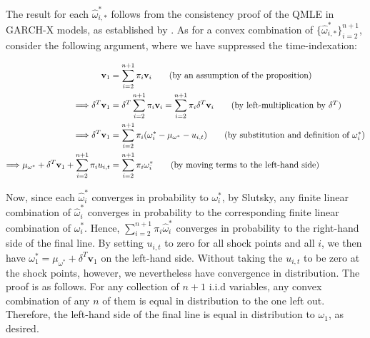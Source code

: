 \documentclass{uiucthesis2021}
\newcommand{\weight}{\pi}
\newcommand{\x}{\textbf{v}}
\theoremstyle{definition}
\newenvironment{proof-of-proposition}[1][{}]{\noindent{\bf
    Proof of Proposition {#1}}
  \hspace*{.5em}}{\qed\bigskip\\}
\begin{document}
    \begin{proof-of-proposition}[\ref{omega_consistency}]
    The result for each $\hat\omega^{*}_{i,*}$ follows from the consistency proof of the QMLE in GARCH-X models, as established by \cite[][]{han2014asymptotic}.  As for a convex combination of $\{\hat\omega^{*}_{i,*}\}_{i=2}^{n+1}$, consider the following argument, where we have suppressed the time-indexation:

    \begin{align}
    \x_{1} &= \sum^{n+1}_{i=2}\weight_{i}\x_{i} \tag{by an assumption of the proposition}\\
   \Longrightarrow \delta^{T}\x_{1} &= \delta^{T}\sum^{n+1}_{i=2}\weight_{i}\x_{i}  = \sum^{n+1}_{i=2}\weight_{i}\delta^{T}\x_{i}\tag{by left-multiplication by $\delta^{T}$}\\
    \Longrightarrow\delta^{T}\x_{1} &=\sum^{n+1}_{i=2}\pi_{i}(\omega_{i}^{*} - \mu_{\omega^{*}} - u_{i,t})\tag{by substitution and definition of $\omega^{*}_{i}$}\\
    \Longrightarrow\mu_{\omega^{*}} + \delta^{T}\x_{1} + \sum^{n+1}_{i=2}\pi_{i}u_{i,t} &= \sum^{n+1}_{i=2}\pi_{i}\omega_{i}^{*} \tag{by moving  terms to the left-hand side}
    \end{align}

Now, since each $\hat\omega^{*}_{i}$ converges in probability to $\omega^{*}_{i}$, by Slutsky, any finite linear combination of $\hat\omega^{*}_{i}$ converges in probability to the corresponding finite linear combination of $\omega^{*}_{i}$.  Hence, $\sum^{n+1}_{i=2}\pi_{i}\hat\omega_{i}^{*}$ converges in probability to the right-hand side of the final line.  By setting $u_{i,t}$ to zero for all shock points and all $i$, we then have $\omega_{1}^{*} = \mu_{\omega^{*}} + \delta^{T}\x_{1} $ on the left-hand side.  Without taking the $u_{i,t}$ to be zero at the shock points, however, we nevertheless have convergence in distribution.  The proof is as follows.  For any collection of $n+1$ i.i.d variables, any convex combination of any $n$ of them is equal in distribution to the one left out.  Therefore, the left-hand side of the final line is equal in distribution to $\omega_{1}$, as desired.
    \end{proof-of-proposition}
\end{document}
